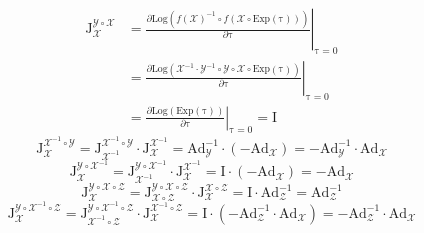 \documentclass[12pt, onecolumn]{article}
\newcommand\Exp[1]{\mathrm{Exp}\left( #1\right) }
\newcommand\Log[1]{\mathrm{Log}\left( #1\right) }
\newcommand\bsm[1]{\boldsymbol{\mathrm{#1}}}
\begin{document}
	\vspace{5mm}
	\begin{equation}
	\begin{aligned}
	\bsm{J}_{\mathcal{X}}^{\mathcal{Y}\circ\mathcal{X}}&=
	\left. \frac{\partial \Log{f(\mathcal{X})^{-1}\circ f(\mathcal{X}\circ\Exp{\bsm\tau})}}{\partial \bsm{\tau}}\right|_{\bsm{\tau}=0}
	\\&=	\left. \frac{\partial \Log{\mathcal{X}^{-1}\cdot\mathcal{Y}^{-1}\circ \mathcal{Y}\circ\mathcal{X}\circ\Exp{\bsm\tau}}}{\partial \bsm{\tau}}\right|_{\bsm{\tau}=0}
	\\&=	\left. \frac{\partial \Log{\Exp{\bsm\tau}}}{\partial \bsm{\tau}}\right|_{\bsm{\tau}=0}=\bsm{I}
	\end{aligned}
	\end{equation}
	\vspace{5mm}
	\begin{equation}
	\bsm{J}_{\mathcal{X}}^{\mathcal{X}^{-1}\circ\mathcal{Y}}=
	\bsm{J}_{\mathcal{X}^{-1}}^{\mathcal{X}^{-1}\circ\mathcal{Y}}\cdot
	\bsm{J}_{\mathcal{X}}^{\mathcal{X}^{-1}}
	=\bsm{Ad}_{\mathcal{Y}}^{-1}\cdot\left( -\bsm{Ad}_{\mathcal{X}}\right) 
	=-\bsm{Ad}_{\mathcal{Y}}^{-1}\cdot\bsm{Ad}_{\mathcal{X}}
	\end{equation}
	\vspace{5mm}
	\begin{equation}
	\bsm{J}_{\mathcal{X}}^{\mathcal{Y}\circ\mathcal{X}^{-1}}=
	\bsm{J}_{\mathcal{X}^{-1}}^{\mathcal{Y}\circ\mathcal{X}^{-1}}\cdot
	\bsm{J}_{\mathcal{X}}^{\mathcal{X}^{-1}}
	=\bsm{I}\cdot\left( -\bsm{Ad}_{\mathcal{X}}\right) =-\bsm{Ad}_{\mathcal{X}}
	\end{equation}
	\vspace{5mm}
	\begin{equation}
	\bsm{J}_{\mathcal{X}}^{\mathcal{Y}\circ\mathcal{X}\circ\mathcal{Z}}=
	\bsm{J}_{\mathcal{X}\circ\mathcal{Z}}^{\mathcal{Y}\circ\mathcal{X}\circ\mathcal{Z}}\cdot\bsm{J}_{\mathcal{X}}^{\mathcal{X}\circ\mathcal{Z}}
	=\bsm{I}\cdot\bsm{Ad}_{\mathcal{Z}}^{-1}=\bsm{Ad}_{\mathcal{Z}}^{-1}
	\end{equation}
	\vspace{5mm}
	\begin{equation}
	\bsm{J}_{\mathcal{X}}^{\mathcal{Y}\circ\mathcal{X}^{-1}\circ\mathcal{Z}}=
	\bsm{J}_{\mathcal{X}^{-1}\circ\mathcal{Z}}^{\mathcal{Y}\circ\mathcal{X}^{-1}\circ\mathcal{Z}}\cdot\bsm{J}_{\mathcal{X}}^{\mathcal{X}^{-1}\circ\mathcal{Z}}
	=\bsm{I}\cdot\left( -\bsm{Ad}_{\mathcal{Z}}^{-1}\cdot\bsm{Ad}_{\mathcal{X}}\right)
	= -\bsm{Ad}_{\mathcal{Z}}^{-1}\cdot\bsm{Ad}_{\mathcal{X}}
	\end{equation}
	
\end{document}
